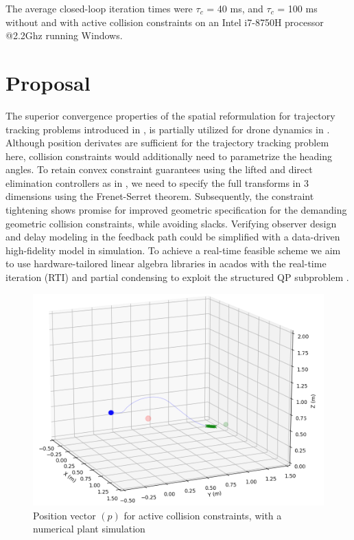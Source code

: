 \documentclass[conference]{IEEEtran}
\begin{document}
The average closed-loop iteration times were $\tau_{c}$ = 40 ms, and $\tau_{c}$ = 100 ms without and with active collision constraints on an Intel i7-8750H processor @2.2Ghz running Windows.
\section{Proposal}\label{Section6}
\par The superior convergence properties of the spatial reformulation for trajectory tracking problems introduced in \cite{werling_invariant_2010}, is partially utilized for drone dynamics in \cite{arrizabalaga_towards_2022}. Although position derivates are sufficient for the trajectory tracking problem here, collision constraints would additionally need to parametrize the heading angles. To retain convex constraint guarantees using the lifted and direct elimination controllers as in \cite{reiter_frenet-cartesian_2023}, we need to specify the full transforms in 3 dimensions using the Frenet-Serret theorem. Subsequently, the constraint tightening \cite{reiter_progressive_nodate} shows promise for improved geometric specification for the demanding geometric collision constraints, while avoiding slacks.
Verifying observer design and delay modeling in the feedback path could be simplified with a data-driven high-fidelity model \cite{llanes_crazysim_nodate} in simulation. To achieve a real-time feasible scheme we aim to use hardware-tailored linear algebra libraries \cite{frison_blasfeo_2018} in acados \cite{verschueren_acados_2020} with the real-time iteration \cite{gros_linear_2020} (RTI) and partial condensing to exploit the structured QP subproblem \cite{frison_hpipm_2020}.
\begin{figure}[t!]
	\centerline{\includegraphics[scale = 0.4]{figures/Screenshot_OLwO_ST.png} }
	\caption{Position vector $(p)$ for active collision constraints, with a numerical plant simulation}
	\label{Fig4}
\end{figure}


\end{document}
